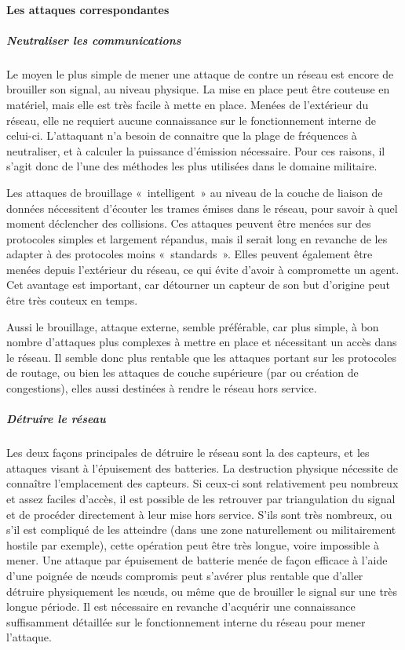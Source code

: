        \paragraph{Les attaques correspondantes}
            \subparagraph{Neutraliser les communications}
Le moyen le plus simple de mener une attaque de \dds contre un réseau est encore de brouiller son signal, au niveau physique.
La mise en place peut être couteuse en matériel, mais elle est très facile à mette en place.
Menées de l'extérieur du réseau, elle ne requiert aucune connaissance sur le fonctionnement interne de celui-ci.
L'attaquant n'a besoin de connaitre que la plage de fréquences à neutraliser, et à calculer la puissance d'émission nécessaire.
Pour ces raisons, il s'agit donc de l'une des méthodes les plus utilisées dans le domaine militaire.

Les attaques de brouillage « intelligent » au niveau de la couche de liaison de données nécessitent d'écouter les trames émises dans le réseau, pour savoir à quel moment déclencher des collisions.
Ces attaques peuvent être menées sur des protocoles simples et largement répandus, mais il serait long en revanche de les adapter à des protocoles moins « standards ».
Elles peuvent également être menées depuis l'extérieur du réseau, ce qui évite d'avoir à compromette un agent.
Cet avantage est important, car détourner un capteur de son but d'origine peut être très couteux en temps.

Aussi le brouillage, attaque externe, semble préférable, car plus simple, à bon nombre d'attaques plus complexes à mettre en place et nécessitant un accès dans le réseau.
Il semble donc plus rentable que les attaques portant sur les protocoles de routage, ou bien les attaques de couche supérieure (par \desync ou création de congestions), elles aussi destinées à rendre le réseau hors service.

            \subparagraph{Détruire le réseau}
Les deux façons principales de détruire le réseau sont la  des capteurs, et les attaques visant à l'épuisement des batteries.
La destruction physique nécessite de connaître l'emplacement des capteurs.
Si ceux-ci sont relativement peu nombreux et assez faciles d'accès, il est possible de les retrouver par triangulation du signal et de procéder directement à leur mise hors service.
S'ils sont très nombreux, ou s'il est compliqué de les atteindre (dans une zone naturellement ou militairement hostile par exemple), cette opération peut être très longue, voire impossible à mener.
Une attaque par épuisement de batterie menée de façon efficace à l'aide d'une poignée de nœuds compromis peut s'avérer plus rentable que d'aller détruire physiquement les nœuds, ou même que de brouiller le signal sur une très longue période.
Il est nécessaire en revanche d'acquérir une connaissance suffisamment détaillée sur le fonctionnement interne du réseau pour mener l'attaque.

